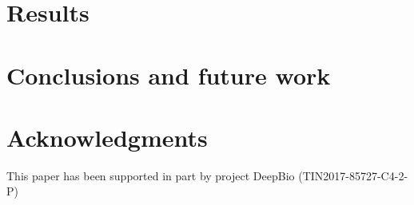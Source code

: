 \documentclass[conference]{IEEEtran}\usepackage[]{graphicx}\usepackage[]{color}
\begin{document}
\section{Results}
\label{sec:res}


\section{Conclusions and future work}
\label{sec:conclus}


\section*{Acknowledgments}

This paper has been supported in part by project DeepBio (TIN2017-85727-C4-2-P)



\end{document}
